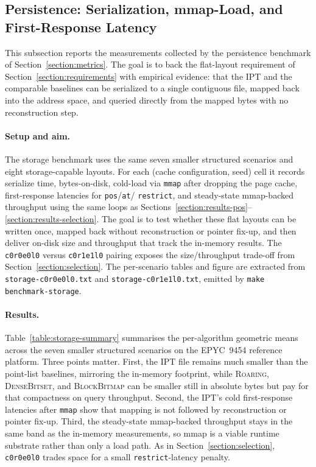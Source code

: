 \documentclass[manuscript,screen,review]{acmart}
\theoremstyle{definition}
\theoremstyle{plain}
\begin{document}
\subsection{Persistence: Serialization, mmap-Load, and First-Response Latency}
\label{section:results-storage}

This subsection reports the measurements collected by the persistence
benchmark of Section~\ref{section:metrics}. The goal is to back the
flat-layout requirement of Section~\ref{section:requirements} with
empirical evidence: that the IPT and the comparable baselines can be
serialized to a single contiguous file, mapped back into the address
space, and queried directly from the mapped bytes with no
reconstruction step.

\paragraph{Setup and aim.} The storage benchmark uses the same seven
smaller structured scenarios and eight storage-capable layouts. For
each (cache configuration, seed) cell it records serialize time,
bytes-on-disk, cold-load via \texttt{mmap} after dropping the page
cache, first-response latencies for \texttt{pos}/\texttt{at}/
\texttt{restrict}, and steady-state mmap-backed throughput using the
same loops as Sections~\ref{section:results-pos}--%
\ref{section:results-selection}. The goal is to test whether these
flat layouts can be written once, mapped back without reconstruction
or pointer fix-up, and then deliver on-disk size and throughput that
track the in-memory results. The \texttt{c0r0e0l0} versus
\texttt{c0r1e1l0} pairing exposes the size/throughput trade-off from
Section~\ref{section:selection}. The per-scenario tables and figure
are extracted from \texttt{storage-c0r0e0l0.txt} and
\texttt{storage-c0r1e1l0.txt}, emitted by
\texttt{make benchmark-storage}.

\paragraph{Results.}
Table~\ref{table:storage-summary} summarises the per-algorithm
geometric means across the seven smaller structured scenarios on the
EPYC~9454 reference platform. Three points matter. First, the IPT file
remains much smaller than the point-list baselines, mirroring the
in-memory footprint, while \textsc{Roaring}, \textsc{DenseBitset}, and
\textsc{BlockBitmap} can be smaller still in absolute bytes but pay
for that compactness on query throughput. Second, the IPT's cold
first-response latencies after \texttt{mmap} show that mapping is not
followed by reconstruction or pointer fix-up. Third, the steady-state
mmap-backed throughput stays in the same band as the in-memory
measurements, so mmap is a viable runtime substrate rather than only a
load path. As in Section~\ref{section:selection}, \texttt{c0r0e0l0}
trades space for a small \texttt{restrict}-latency penalty.
\end{document}
